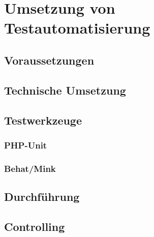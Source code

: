 \newpage
\section{Umsetzung von Testautomatisierung}

\subsection{Voraussetzungen}

\subsection{Technische Umsetzung}




\subsection{Testwerkzeuge}
\subsubsection{PHP-Unit}
\subsubsection{Behat/Mink}


\subsection{Durchführung}

\subsection{Controlling}
